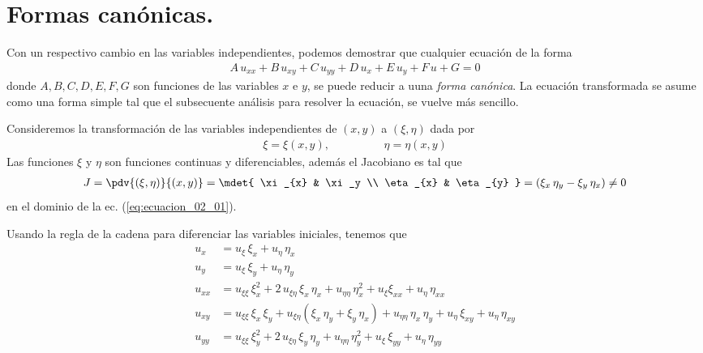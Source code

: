 \section{Formas canónicas.}
Con un respectivo cambio en las variables independientes, podemos demostrar que cualquier ecuación de la forma
\begin{align}
A \, u_{xx} + B \, u_{xy} + C \, u_{yy} + D \, u_{x} + E \, u_{y} + F \, u + G = 0
\label{eq:ecuacion_02_01}    
\end{align}
donde $A, B, C, D, E, F, G$ son funciones de las variables $x$ e $y$, se puede reducir a uuna \emph{forma canónica}. La ecuación transformada se asume como una forma simple tal que el subsecuente análisis para resolver la ecuación, se vuelve más sencillo.
\par
Consideremos la transformación de las variables independientes de $(x, y)$ a $(\xi, \eta)$ dada por
\begin{align}
\xi = \xi (x, y), \hspace{2cm} \eta = \eta (x, y)
\label{eq:ecuacion_02_02}
\end{align}
Las funciones $\xi$ y $\eta$ son funciones continuas y diferenciables, además el Jacobiano es tal que
\begin{align}
J = \pdv{(\xi, \eta)}{(x, y)} = \mdet{
\xi_{x} & \xi_y \\
\eta_{x} & \eta_{y}
} =
(\xi_{x} \, \eta_{y} - \xi_{y} \, \eta_{x}) \neq 0
\label{eq:ecuacion_02_03}    
\end{align}
en el dominio de la ec. (\ref{eq:ecuacion_02_01}).
\par
Usando la regla de la cadena para diferenciar las variables iniciales, tenemos que
\begin{align*}
u_{x} &= u_{\xi} \, \xi_{x} + u_{\eta} \, \eta_{x} \\
u_{y} &= u_{\xi} \, \xi_{y} + u_{\eta} \, \eta_{y} \\
u_{xx} &= u_{\xi \xi} \, \xi_{x}^{2} + 2 \, u_{\xi \eta} \, \xi_{x} \, \eta_{x} + u_{\eta \eta} \, \eta_{x}^{2} + u_{\xi} \xi_{x x} + u_{\eta} \, \eta_{xx} \\
u_{xy} &= u_{\xi \xi} \, \xi_{x} \, \xi_{y} + u_{\xi \eta} (\xi_{x} \, \eta_{y} + \xi_{y} \, \eta_{x}) + u_{\eta \eta} \, \eta_{x} \, \eta_{y} + u_{\eta} \, \xi_{x y} + u_{\eta} \, \eta_{x y} \\
u_{yy} &= u_{\xi \xi} \, \xi_{y}^{2} + 2 \, u_{\xi \eta} \, \xi_{y} \, \eta_{y} + u_{\eta \eta} \, \eta_{y}^{2} + u_{\xi} \, \xi_{y y} + u_{\eta} \, \eta_{yy}
\end{align*}
